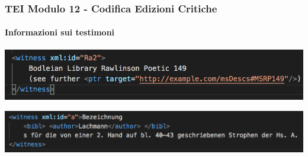 \begin{frame}
    \frametitle{TEI Modulo 12 - Codifica Edizioni Critiche}
    \framesubtitle{Informazioni sui testimoni}
    \addtocounter{nframe}{1}
    




    \begin{center}
        \includegraphics[width=.95\textwidth]{imgs/witness-ref.png}
    \end{center}

    \begin{center}
        \includegraphics[width=.95\textwidth]{imgs/witness-bibl.png}
    \end{center}




\end{frame}




